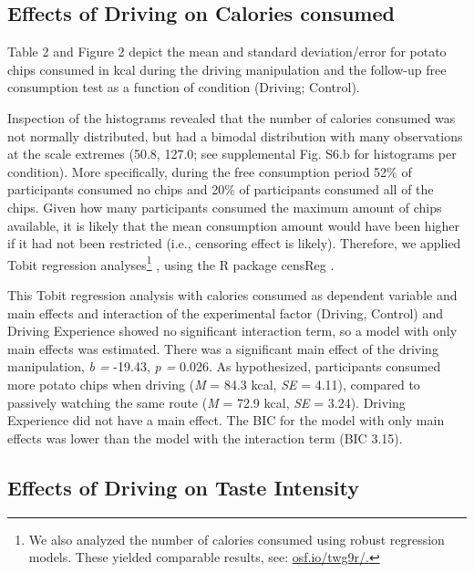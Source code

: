 \documentclass[authordate, empirical, issue]{jote-new-article}
\begin{document}
\subsection{Effects of Driving on Calories consumed }





Table 2 and Figure 2 depict the mean and standard deviation/error for potato chips consumed in kcal during the driving manipulation and the follow-up free consumption test as a function of condition (Driving; Control).


Inspection of the histograms revealed that the number of calories consumed was not normally distributed, but had a bimodal distribution with many observations at the scale extremes (50.8, 127.0; see supplemental Fig. S6.b for histograms per condition). More specifically, during the free consumption period 52\% of participants consumed no chips and 20\% of participants consumed all of the chips. Given how many participants consumed the maximum amount of chips available, it is likely that the mean consumption amount would have been higher if it had not been restricted (i.e., censoring effect is likely). Therefore, we applied Tobit regression analyses\footnote{ We also analyzed the number of calories consumed using robust regression models. These yielded comparable results, see: \url{osf.io/twg9r/.}} \parencites[i.e., censored regression models][]{Tobin1958}, using the R package censReg \parencites{Henningsen2010}.



This Tobit regression analysis with calories consumed as dependent variable and main effects and interaction of the experimental factor (Driving, Control) and Driving Experience showed no significant interaction term, so a model with only main effects was estimated. There was a significant main effect of the driving manipulation, \emph{b = }-19.43, \emph{p = }0.026. As hypothesized, participants consumed more potato chips when driving (\emph{M }= 84.3 kcal, \emph{SE }= 4.11), compared to passively watching the same route (\emph{M }= 72.9 kcal, \emph{SE }= 3.24). Driving Experience did not have a main effect. The BIC for the model with only main effects was lower than the model with the interaction term (BIC 3.15).




\subsection{Effects of Driving on Taste Intensity }
\end{document}
